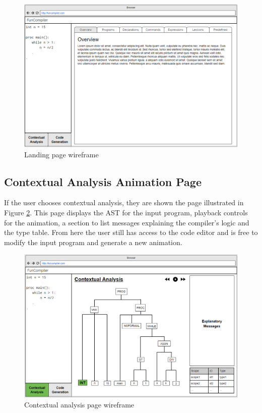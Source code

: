 \documentclass{l4proj}
\begin{document}
 \begin{figure}[h]
\centering
\includegraphics[scale=0.4]{images/full1.png}
\caption{Landing page wireframe}
\label{fig:full1}	
\end{figure}

\subsection{Contextual Analysis Animation Page}
If the user chooses contextual analysis, they are shown the page illustrated in Figure \ref{fig:full2}. This page displays the AST for the input program, playback controls for the animation, a section to list messages explaining the compiler's logic and the type table. From here the user still has access to the code editor and is free to modify the input program and generate a new animation. 

 \begin{figure}[h]
\centering
\includegraphics[scale=0.4]{images/full2.png}
\caption{Contextual analysis page wireframe}
\label{fig:full2}	
\end{figure}
\end{document}
